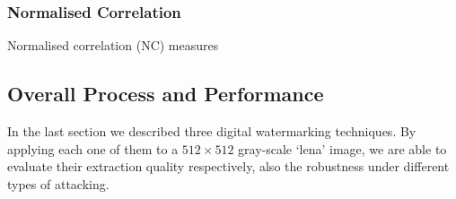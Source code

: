 \subsubsection{Normalised Correlation}
Normalised correlation (NC) measures 


\subsection{Overall Process and Performance}
In the last section we described three digital watermarking techniques. By applying each one of them to a $512 \times 512$ gray-scale `lena' image, we are able to evaluate their extraction quality respectively, also the robustness under different types of attacking.  

